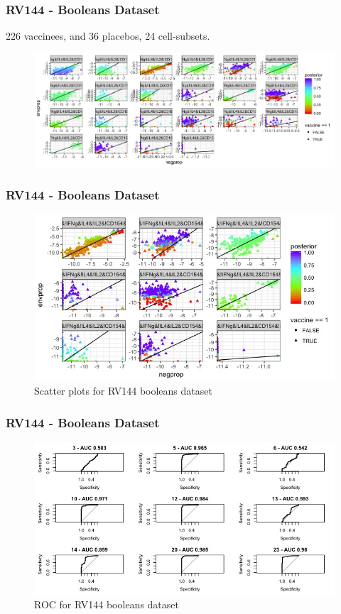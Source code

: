 \documentclass{beamer}
\theoremstyle{definition}
\begin{document}

\begin{frame}
\frametitle{RV144 - Booleans Dataset}
226 vaccinees, and 36 placebos, 24 cell-subsets.
\begin{figure}[]
\includegraphics[width=10 cm]{figures/fullBooleansScatter}
\end{figure}
\end{frame}


\begin{frame}
\frametitle{RV144 - Booleans Dataset}
\begin{figure}[]
\includegraphics[width=12 cm]{figures/boolScatterLessWide} \caption{Scatter plots for RV144 booleans dataset}
\end{figure}
\end{frame}


\begin{frame}
\frametitle{RV144 - Booleans Dataset}
\begin{figure}[]
\includegraphics[width=12 cm]{figures/boolROC} \caption{ROC for RV144 booleans dataset}
\end{figure}
\end{frame}
\end{document}
